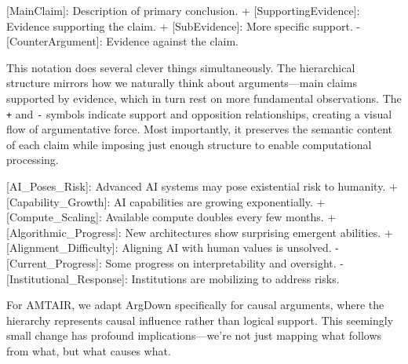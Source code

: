 \documentclass[
  11pt,
  letterpaper,
]{book}
\newenvironment{Shaded}{\begin{snugshade}}{\end{snugshade}}
\newcommand{\CommentTok}[1]{\textcolor[rgb]{0.37,0.37,0.37}{#1}}
\newcommand{\NormalTok}[1]{\textcolor[rgb]{0.00,0.23,0.31}{#1}}
\newcommand{\OtherTok}[1]{\textcolor[rgb]{0.00,0.23,0.31}{#1}}
\newcommand{\SpecialStringTok}[1]{\textcolor[rgb]{0.13,0.47,0.30}{#1}}
\begin{document}
\begin{Shaded}
\begin{Highlighting}[]
\OtherTok{[MainClaim]: }\NormalTok{Description of primary conclusion.}
\SpecialStringTok{ + }\CommentTok{[}\OtherTok{SupportingEvidence}\CommentTok{]}\NormalTok{: Evidence supporting the claim.}
\SpecialStringTok{   + }\CommentTok{[}\OtherTok{SubEvidence}\CommentTok{]}\NormalTok{: More specific support.}
\SpecialStringTok{ {-} }\CommentTok{[}\OtherTok{CounterArgument}\CommentTok{]}\NormalTok{: Evidence against the claim.}
\end{Highlighting}
\end{Shaded}

This notation does several clever things simultaneously. The
hierarchical structure mirrors how we naturally think about
arguments---main claims supported by evidence, which in turn rest on
more fundamental observations. The \texttt{+} and \texttt{-} symbols
indicate support and opposition relationships, creating a visual flow of
argumentative force. Most importantly, it preserves the semantic content
of each claim while imposing just enough structure to enable
computational processing.

\begin{Shaded}
\begin{Highlighting}[]
\OtherTok{[AI\_Poses\_Risk]: }\NormalTok{Advanced AI systems may pose existential risk to humanity.}
\SpecialStringTok{ + }\CommentTok{[}\OtherTok{Capability\_Growth}\CommentTok{]}\NormalTok{: AI capabilities are growing exponentially.}
\SpecialStringTok{   + }\CommentTok{[}\OtherTok{Compute\_Scaling}\CommentTok{]}\NormalTok{: Available compute doubles every few months.}
\SpecialStringTok{   + }\CommentTok{[}\OtherTok{Algorithmic\_Progress}\CommentTok{]}\NormalTok{: New architectures show surprising emergent abilities.}
\SpecialStringTok{ + }\CommentTok{[}\OtherTok{Alignment\_Difficulty}\CommentTok{]}\NormalTok{: Aligning AI with human values is unsolved.}
\SpecialStringTok{   {-} }\CommentTok{[}\OtherTok{Current\_Progress}\CommentTok{]}\NormalTok{: Some progress on interpretability and oversight.}
\SpecialStringTok{ {-} }\CommentTok{[}\OtherTok{Institutional\_Response}\CommentTok{]}\NormalTok{: Institutions are mobilizing to address risks.}
\end{Highlighting}
\end{Shaded}

For AMTAIR, we adapt ArgDown specifically for causal arguments, where
the hierarchy represents causal influence rather than logical support.
This seemingly small change has profound implications---we're not just
mapping what follows from what, but what causes what.
\end{document}
